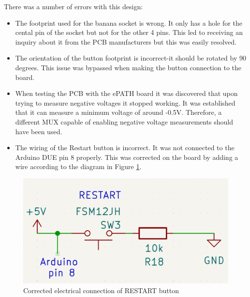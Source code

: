 There was a number of errors with this design:
\begin{itemize}
\item The footprint used for the banana socket is wrong. It only has a hole for the cental pin of the socket but not for the other 4 pins. This led to receiving an inquiry about it from the PCB manufacturers but this was easily resolved.
\item The orientation of the button footprint is incorrect-it should be rotated by 90 degrees. This issue was bypassed when making the button connection to the board.
\item When testing the PCB with the ePATH board it was discovered that upon trying to measure negative voltages it stopped working. It was established that it can measure a minimum voltage of around -0.5V. Therefore, a different MUX capable of enabling negative voltage measurements should have been used.
\item The wiring of the Restart button is incorrect. It was not connected to the Arduino DUE pin 8 properly. This was corrected on the board by adding a wire according to the diagram in Figure \ref{button_wiring}.
\end{itemize}

\begin{figure}[H]
          \centering
          \includegraphics[width=1\linewidth]{img/button_wiring.png}
          \caption{Corrected electrical connection of RESTART button}
          \label{button_wiring}
    \end{figure}



